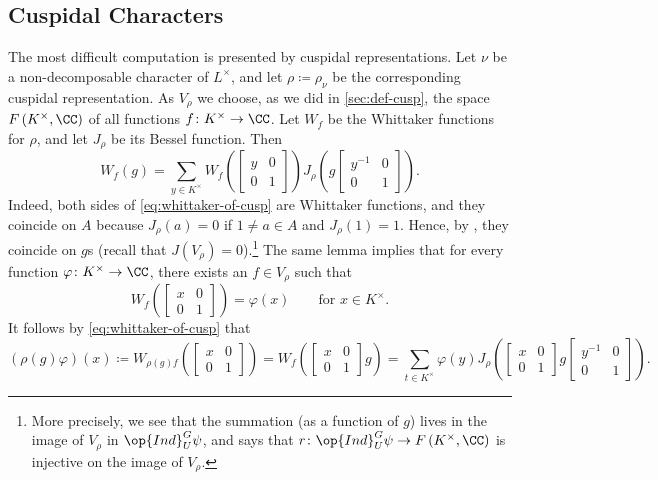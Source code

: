 \documentclass[../main.tex]{subfiles}
\begin{document}
\subsection{Cuspidal Characters}
The most difficult computation is presented by cuspidal representations. Let $\nu$ be a non-decomposable character of $L^\times$, and let $\rho\coloneqq\rho_\nu$ be the corresponding cuspidal representation. As $V_\rho$ we choose, as we did in \cref{sec:def-cusp}, the space $F\left(K^\times,\CC\right)$ of all functions $f\colon K^\times\to\CC$. Let $W_f$ be the Whittaker functions for $\rho$, and let $J_\rho$ be its Bessel function. Then
\begin{equation}
	W_f(g)=\sum_{y\in K^\times}W_f\left(\begin{bmatrix}
		y & 0 \\
		0 & 1
	\end{bmatrix}\right)J_\rho\left(g\begin{bmatrix}
		y^{-1} & 0 \\
		0 & 1
	\end{bmatrix}\right). \label{eq:whittaker-of-cusp}
\end{equation}
Indeed, both sides of \eqref{eq:whittaker-of-cusp} are Whittaker functions, and they coincide on $A$ because $J_\rho(a)=0$ if $1\ne a\in A$ and $J_\rho(1)=1$. Hence, by , they coincide on $g$s (recall that $J(V_\rho)=0$).\footnote{More precisely, we see that the summation (as a function of $g$) lives in the image of $V_\rho$ in $\op{Ind}^G_U\psi$, and  says that $r\colon\op{Ind}^G_U\psi\to F\left(K^\times,\CC\right)$ is injective on the image of $V_\rho$.} The same lemma implies that for every function $\varphi\colon K^\times\to\CC$, there exists an $f\in V_\rho$ such that
\[W_f\left(\begin{bmatrix}
	x & 0 \\
	0 & 1
\end{bmatrix}\right)=\varphi(x)\qquad\text{for }x\in K^\times.\]
It follows by \eqref{eq:whittaker-of-cusp} that
\begin{equation}
	(\rho(g)\varphi)(x)\coloneqq W_{\rho(g)f}\left(\begin{bmatrix}
		x & 0 \\
		0 & 1
	\end{bmatrix}\right)=W_f\left(\begin{bmatrix}
		x & 0 \\
		0 & 1
	\end{bmatrix}g\right)=\sum_{t\in K^\times}\varphi(y)J_\rho\left(\begin{bmatrix}
		x & 0 \\
		0 & 1
	\end{bmatrix}g\begin{bmatrix}
		y^{-1} & 0 \\
		0 & 1
	\end{bmatrix}\right). \label{eq:def-g-phi}
\end{equation}
\end{document}
